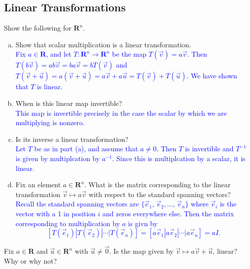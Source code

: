 \documentclass[a4paper,11pt]{article}
\newcommand{\R}{\mathbf{R}}
\newcommand{\BB}[1]{\textcolor{blue}{#1}}
\begin{document}
\subsection*{Linear Transformations}

 Show the following for $\R^n$.
\begin{enumerate}[(a)]
\item Show that scalar multiplication is a linear transformation. \\

  \BB{Fix $a \in \R$, and let $T:\R^n \rightarrow \R^n$ be the map $T(\vec
    v)=a\vec v$. Then $T(b\vec v)=ab\vec v=ba\vec v=bT(\vec v)$ and $T(\vec
    v+\vec u)=a(\vec v+\vec u)=a\vec v+a\vec u=T(\vec v)+T(\vec u)$. We have
    shown that $T$ is linear. \\}

\item When is this linear map invertible? \\

  \BB{This map is invertible precisely in the case the scalar by which we are
    multiplying is nonzero. \\}
  
\item Is its inverse a linear transformation? \\

  \BB{Let $T$ be as in part (a), and assume that $a \neq 0$. Then $T$ is
    invertible and $T^{-1}$ is given by multiplcation by $a^{-1}$. Since this
    is multiplcation by a scalar, it is linear. \\}
  
\item Fix an element $a \in \R^n$. What is the matrix corresponding to the
linear transformation $\vec v \mapsto a\vec v$ with respect to the standard
spanning vectors? \\

\BB{Recall the standard spanning vectors are $\{\vec e_1,\,\vec e_2,\dots,\,\vec
  e_n\}$ where $\vec e_i$ is the vector with a 1 in position $i$ and zeros
  everywhere else. Then the matrix corresponding to multiplication by $a$ is
  givn by
  \[
    [T(\vec e_1) | T(\vec e_2) | \cdots | T(\vec e_n)]=
    [a\vec e_1 | a\vec e_2 | \cdots | a\vec e_n] = aI.
  \]
}
\end{enumerate}

 Fix $a \in \R$ and $\vec u \in \R^n$ with $\vec
u \neq \vec 0$. Is the map given by $\vec v \mapsto a\vec v + \vec u$, linear?
Why or why not? \\
\end{document}
